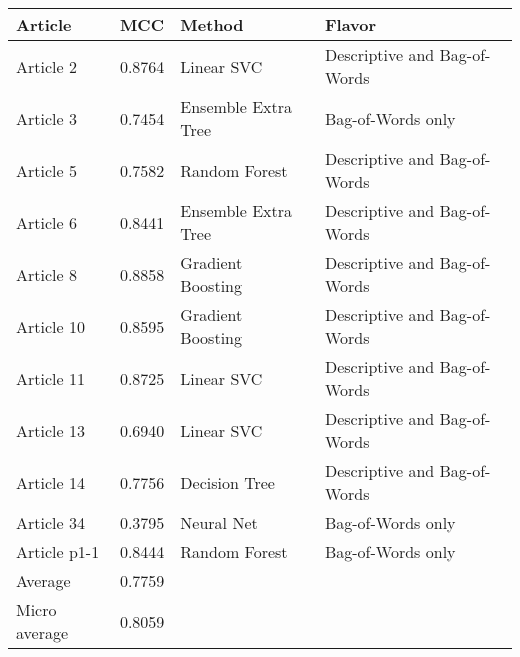 \begin{tabular}{|l|l|l|l| }
\hline
Article & MCC & Method & Flavor \\ \hline
Article 2 & 0.8764 & Linear SVC & Descriptive and Bag-of-Words\\
Article 3 & 0.7454 & Ensemble Extra Tree & Bag-of-Words only\\
Article 5 & 0.7582 & Random Forest & Descriptive and Bag-of-Words\\
Article 6 & 0.8441 & Ensemble Extra Tree & Descriptive and Bag-of-Words\\
Article 8 & 0.8858 & Gradient Boosting & Descriptive and Bag-of-Words\\
Article 10 & 0.8595 & Gradient Boosting & Descriptive and Bag-of-Words\\
Article 11 & 0.8725 & Linear SVC & Descriptive and Bag-of-Words\\
Article 13 & 0.6940 & Linear SVC & Descriptive and Bag-of-Words\\
Article 14 & 0.7756 & Decision Tree & Descriptive and Bag-of-Words\\
Article 34 & 0.3795 & Neural Net & Bag-of-Words only\\
Article p1-1 & 0.8444 & Random Forest & Bag-of-Words only\\
Average & 0.7759 & & \\
Micro average & 0.8059 & & \\
\hline
\end{tabular}